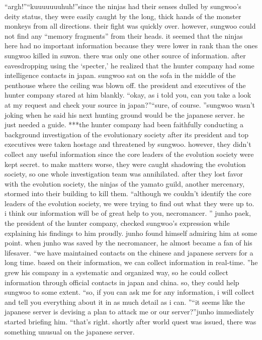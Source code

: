 “argh!”“kuuuuuuuhuh!”since the ninjas had their senses dulled by sungwoo’s deity status, they were easily caught by the long, thick hands of the monster monkeys from all directions.
their fight was quickly over.
however, sungwoo could not find any “memory fragments” from their heads.
it seemed that the ninjas here had no important information because they were lower in rank than the ones sungwoo killed in suwon.
there was only one other source of information.
 after eavesdropping using the ‘specter,’ he realized that the hunter company had some intelligence contacts in japan.
sungwoo sat on the sofa in the middle of the penthouse where the ceiling was blown off.
the president and executives of the hunter company stared at him blankly.
“okay, as i told you, can you take a look at my request and check your source in japan?”“sure, of course.
”sungwoo wasn’t joking when he said his next hunting ground would be the japanese server.
 he just needed a guide.
***the hunter company had been faithfully conducting a background investigation of the evolutionary society after its president and top executives were taken hostage and threatened by sungwoo.
however, they didn’t collect any useful information since the core leaders of the evolution society were kept secret.
 to make matters worse, they were caught shadowing the evolution society, so one whole investigation team was annihilated.
after they lost favor with the evolution society, the ninjas of the yamato guild, another mercenary, stormed into their building to kill them.
“although we couldn’t identify the core leaders of the evolution society, we were trying to find out what they were up to.
 i think our information will be of great help to you, necromancer.
”
junho paek, the president of the hunter company, checked sungwoo’s expression while explaining his findings to him proudly.
junho found himself admiring him at some point.
 when junho was saved by the necromancer, he almost became a fan of his lifesaver.
“we have maintained contacts on the chinese and japanese servers for a long time.
 based on their information, we can collect information in real-time.
”he grew his company in a systematic and organized way, so he could collect information through official contacts in japan and china.
 so, they could help sungwoo to some extent.
“so, if you can ask me for any information, i will collect and tell you everything about it in as much detail as i can.
”“it seems like the japanese server is devising a plan to attack me or our server?”junho immediately started briefing him.
“that’s right.
 shortly after world quest was issued, there was something unusual on the japanese server.
